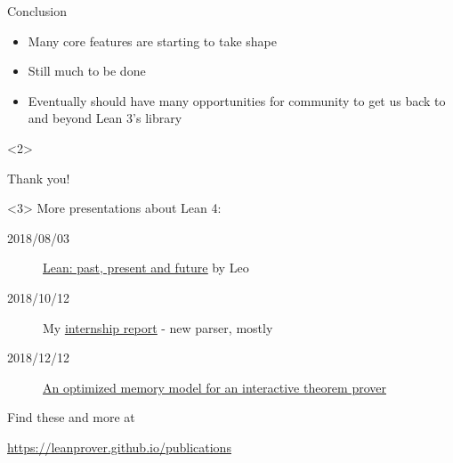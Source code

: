 \documentclass[t]{beamer}
\begin{document}
\begin{frame}[fragile]{Conclusion}
  \begin{itemize}
  \item Many core features are starting to take shape
  \item Still much to be done
  \item Eventually should have many opportunities for community to get us back to
    and beyond Lean 3's library
  \end{itemize}

  \pause
  \vfill

  \begin{onlyenv}<2> 
  \begin{center}
    \Huge{Thank you!}
  \end{center}
  \end{onlyenv}
  \begin{onlyenv}<3> More presentations about Lean 4:
    \begin{description}
    \item[2018/08/03]
      \href{http://leanprover.github.io/talks/LeanAtGalois.pdf}{\color{blue}\underline{Lean:
          past, present and future}} by Leo
    \item[2018/10/12] My
      \href{http://leanprover.github.io/presentations/20181012_MSR}{\color{blue}\underline{internship
          report}} - new parser, mostly
    \item[2018/12/12]
      \href{https://www.youtube.com/watch?v=Bv0CXyhbJ5s}{\color{blue}\underline{An
          optimized memory model for an interactive theorem prover}}
    \end{description}

    \bigskip

    Find these and more at
    \begin{center}
      \url{https://leanprover.github.io/publications}
    \end{center}
  \end{onlyenv}
\end{frame}
\end{document}
